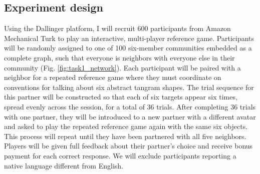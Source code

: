 \documentclass[11pt, floatsintext]{apa6}
\begin{document}
\subsection{Experiment design}
Using the Dallinger platform, I will recruit 600 participants from Amazon Mechanical Turk to play an interactive, multi-player reference game. 
Participants will be randomly assigned to one of 100 six-member communities embedded as a complete graph, such that everyone is neighbors with everyone else in their community (Fig. \ref{fig:task1_network}). 
Each participant will be paired with a neighbor for a repeated reference game where they must coordinate on conventions for talking about six abstract tangram shapes.
The trial sequence for this partner will be constructed so that each of six targets appear six times, spread evenly across the session, for a total of 36 trials.
After completing 36 trials with one partner, they will be introduced to a new partner with a different avatar and asked to play the repeated reference game again with the same six objects.
This process will repeat until they have been partnered with all five neighbors.
Players will be given full feedback about their partner's choice and receive bonus payment for each correct response. 
We will exclude participants reporting a native language different from English. 
\end{document}
